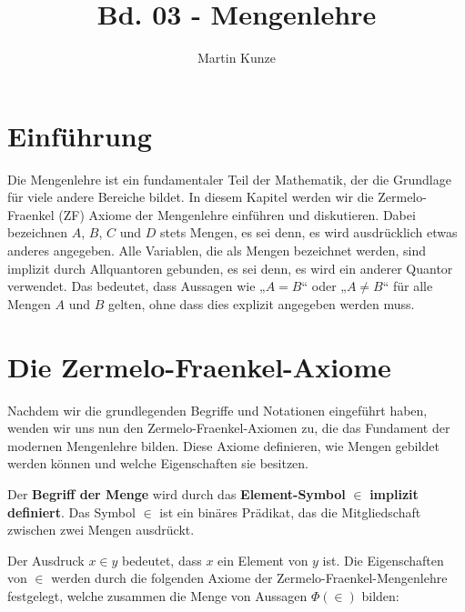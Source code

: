 \documentclass[main.tex]{subfiles}
\title{Bd. 03 - Mengenlehre}
\author{Martin Kunze}
\date{}
\begin{document}
\maketitle
\tableofcontents



\chapter{Einführung}

Die Mengenlehre ist ein fundamentaler Teil der Mathematik, der die Grundlage für viele andere Bereiche bildet. In diesem Kapitel werden wir die Zermelo-Fraenkel (ZF) Axiome der Mengenlehre einführen und diskutieren. Dabei bezeichnen \( A \), \( B \), \( C \) und \( D \) stets Mengen, es sei denn, es wird ausdrücklich etwas anderes angegeben. Alle Variablen, die als Mengen bezeichnet werden, sind implizit durch Allquantoren gebunden, es sei denn, es wird ein anderer Quantor verwendet. Das bedeutet, dass Aussagen wie „\( A = B \)“ oder „\( A \neq B \)“ für alle Mengen \( A \) und \( B \) gelten, ohne dass dies explizit angegeben werden muss.

\chapter{Die Zermelo-Fraenkel-Axiome}

Nachdem wir die grundlegenden Begriffe und Notationen eingeführt haben, wenden wir uns nun den Zermelo-Fraenkel-Axiomen zu, die das Fundament der modernen Mengenlehre bilden. Diese Axiome definieren, wie Mengen gebildet werden können und welche Eigenschaften sie besitzen.
\begin{definition}
Der \textbf{Begriff der Menge} wird durch das \textbf{Element-Symbol} \(\in\) \textbf{implizit definiert}. 
Das Symbol \(\in\) ist ein binäres Prädikat, das die Mitgliedschaft zwischen zwei Mengen ausdrückt. 

Der Ausdruck \(x \in y\) bedeutet, dass \(x\) ein Element von \(y\) ist. Die Eigenschaften von \(\in\) 
werden durch die folgenden Axiome der Zermelo-Fraenkel-Mengenlehre festgelegt, welche zusammen die Menge von 
Aussagen \(\Phi(\in)\) bilden:
\end{definition}

%
{%
% 
}%
\end{document}
